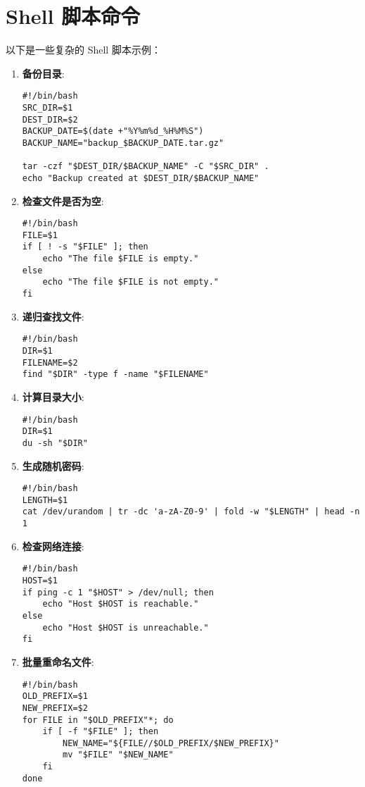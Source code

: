 \documentclass{ctexart}
\begin{document}
\section{Shell 脚本命令}
以下是一些复杂的 Shell 脚本示例：

\begin{enumerate}[label=\arabic*.]
\item \textbf{备份目录}:
\begin{lstlisting}
#!/bin/bash
SRC_DIR=$1
DEST_DIR=$2
BACKUP_DATE=$(date +"%Y%m%d_%H%M%S")
BACKUP_NAME="backup_$BACKUP_DATE.tar.gz"

tar -czf "$DEST_DIR/$BACKUP_NAME" -C "$SRC_DIR" .
echo "Backup created at $DEST_DIR/$BACKUP_NAME"
\end{lstlisting}

\item \textbf{检查文件是否为空}:
\begin{lstlisting}
#!/bin/bash
FILE=$1
if [ ! -s "$FILE" ]; then
    echo "The file $FILE is empty."
else
    echo "The file $FILE is not empty."
fi
\end{lstlisting}

\item \textbf{递归查找文件}:
\begin{lstlisting}
#!/bin/bash
DIR=$1
FILENAME=$2
find "$DIR" -type f -name "$FILENAME"
\end{lstlisting}

\item \textbf{计算目录大小}:
\begin{lstlisting}
#!/bin/bash
DIR=$1
du -sh "$DIR"
\end{lstlisting}

\item \textbf{生成随机密码}:
\begin{lstlisting}
#!/bin/bash
LENGTH=$1
cat /dev/urandom | tr -dc 'a-zA-Z0-9' | fold -w "$LENGTH" | head -n 1
\end{lstlisting}

\item \textbf{检查网络连接}:
\begin{lstlisting}
#!/bin/bash
HOST=$1
if ping -c 1 "$HOST" > /dev/null; then
    echo "Host $HOST is reachable."
else
    echo "Host $HOST is unreachable."
fi
\end{lstlisting}

\item \textbf{批量重命名文件}:
\begin{lstlisting}
#!/bin/bash
OLD_PREFIX=$1
NEW_PREFIX=$2
for FILE in "$OLD_PREFIX"*; do
    if [ -f "$FILE" ]; then
        NEW_NAME="${FILE//$OLD_PREFIX/$NEW_PREFIX}"
        mv "$FILE" "$NEW_NAME"
    fi
done
\end{lstlisting}


\end{enumerate}
\end{document}
